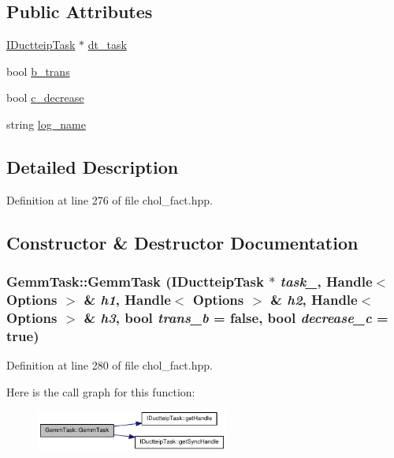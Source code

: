 \subsection*{Public Attributes}
\begin{DoxyCompactItemize}
\item 
\hyperlink{class_i_ductteip_task}{IDuctteipTask} $\ast$ \hyperlink{struct_gemm_task_a1ff91e561ce824a648516638e3b89fb2}{dt\_\-task}
\item 
bool \hyperlink{struct_gemm_task_ae8b3fec03227068a541cb25ef4e9ed60}{b\_\-trans}
\item 
bool \hyperlink{struct_gemm_task_ad557fa1b97cac4870423c0ed9449edc0}{c\_\-decrease}
\item 
string \hyperlink{struct_gemm_task_aeac5a3c852d1c101388988f3ec20465a}{log\_\-name}
\end{DoxyCompactItemize}


\subsection{Detailed Description}


Definition at line 276 of file chol\_\-fact.hpp.

\subsection{Constructor \& Destructor Documentation}
\hypertarget{struct_gemm_task_a9cd60061ae88b345e70ece76d5a36b5a}{
\subsubsection[{GemmTask}]{\setlength{\rightskip}{0pt plus 5cm}GemmTask::GemmTask ({\bf IDuctteipTask} $\ast$ {\em task\_\-}, \/  Handle$<$ {\bf Options} $>$ \& {\em h1}, \/  Handle$<$ {\bf Options} $>$ \& {\em h2}, \/  Handle$<$ {\bf Options} $>$ \& {\em h3}, \/  bool {\em trans\_\-b} = {\ttfamily false}, \/  bool {\em decrease\_\-c} = {\ttfamily true})}}
\label{struct_gemm_task_a9cd60061ae88b345e70ece76d5a36b5a}


Definition at line 280 of file chol\_\-fact.hpp.

Here is the call graph for this function:\nopagebreak
\begin{figure}[H]
\begin{center}
\leavevmode
\includegraphics[width=179pt]{struct_gemm_task_a9cd60061ae88b345e70ece76d5a36b5a_cgraph}
\end{center}
\end{figure}


